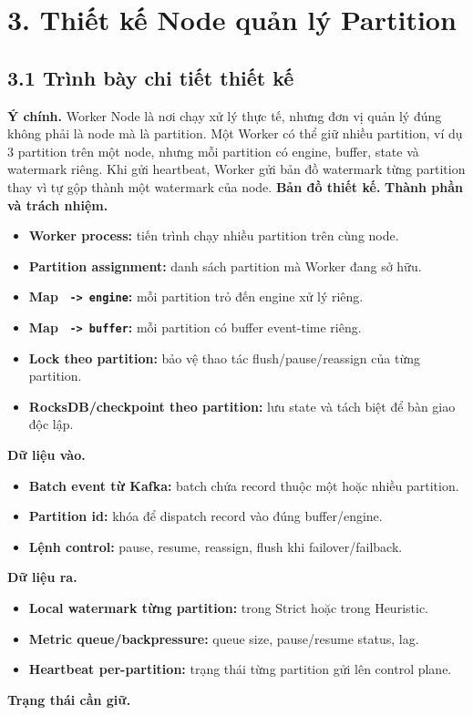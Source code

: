 \documentclass[12pt,a4paper]{article}
\begin{document}
\section{3. Thiết kế Node quản lý Partition}
\label{sec:node-partition}

\subsection{3.1 Trình bày chi tiết thiết kế}
\textbf{Ý chính.} Worker Node là nơi chạy xử lý thực tế, nhưng đơn vị quản lý đúng không phải là node mà là partition. Một Worker có thể giữ nhiều partition, ví dụ 3 partition trên một node, nhưng mỗi partition có engine, buffer, state và watermark riêng. Khi gửi heartbeat, Worker gửi bản đồ watermark từng partition thay vì tự gộp thành một watermark của node.
\textbf{Bản đồ thiết kế.}
\textbf{Thành phần và trách nhiệm.}

\begin{itemize}
\item \textbf{Worker process:} tiến trình chạy nhiều partition trên cùng node.
\item \textbf{Partition assignment:} danh sách partition mà Worker đang sở hữu.
\item \textbf{Map \texttt{ -> engine}:} mỗi partition trỏ đến engine xử lý riêng.
\item \textbf{Map \texttt{ -> buffer}:} mỗi partition có buffer event-time riêng.
\item \textbf{Lock theo partition:} bảo vệ thao tác flush/pause/reassign của từng partition.
\item \textbf{RocksDB/checkpoint theo partition:} lưu state và  tách biệt để bàn giao độc lập.
\end{itemize}
\textbf{Dữ liệu vào.}

\begin{itemize}
\item \textbf{Batch event từ Kafka:} batch chứa record thuộc một hoặc nhiều partition.
\item \textbf{Partition id:} khóa để dispatch record vào đúng buffer/engine.
\item \textbf{Lệnh control:} pause, resume, reassign, flush khi failover/failback.
\end{itemize}
\textbf{Dữ liệu ra.}

\begin{itemize}
\item \textbf{Local watermark từng partition:}  trong Strict hoặc  trong Heuristic.
\item \textbf{Metric queue/backpressure:} queue size, pause/resume status, lag.
\item \textbf{Heartbeat per-partition:} trạng thái từng partition gửi lên control plane.
\end{itemize}
\textbf{Trạng thái cần giữ.}
\end{document}
